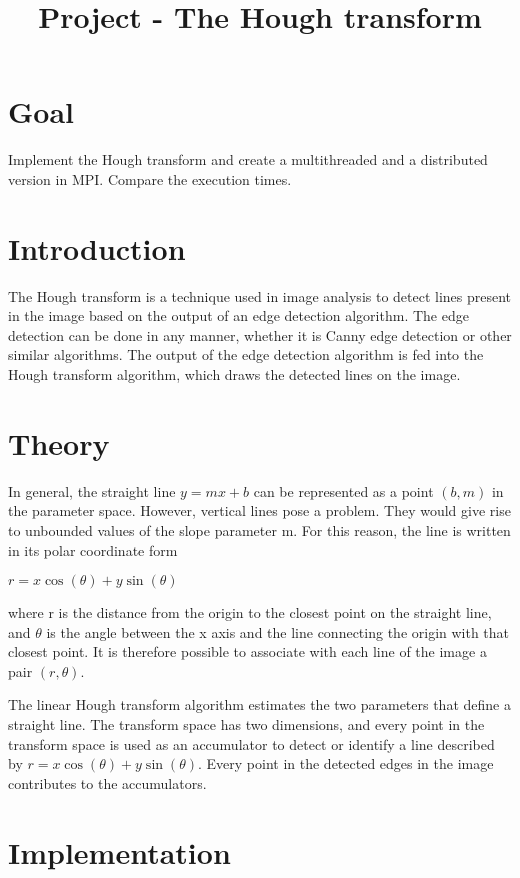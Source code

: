 \documentclass[journal, onecolumn, 12pt]{IEEEtran}
\begin{document}
\title{Project - The Hough transform \\
}

\maketitle

\section{Goal}
Implement the Hough transform and create a multithreaded and a distributed version in MPI. Compare the execution times.


\section{Introduction}
The Hough transform is a technique used in image analysis to detect lines present in the image based on the output of an edge detection algorithm. The edge detection can be done in any manner, whether it is Canny edge detection or other similar algorithms.
The output of the edge detection algorithm is fed into the Hough transform algorithm, which draws the detected lines on the image.

\section{Theory}
In general, the straight line $ y = mx + b $ can be represented as a point $ (b, m) $ in the parameter space. However, vertical lines pose a problem. They would give rise to unbounded values of the slope parameter m. For this reason, the line is written in its polar coordinate form 

	$ r = x\cos(\theta) + y\sin(\theta)$

where r is the distance from the origin to the closest point on the straight line, and $ \theta $ is the angle between the x axis and the line connecting the origin with that closest point. It is therefore possible to associate with each line of the image a pair $ (r, \theta) $. 

The linear Hough transform algorithm estimates the two parameters that define a straight line. The transform space has two dimensions, and every point in the transform space is used as an accumulator to detect or identify a line described by $ r = x\cos(\theta) + y\sin(\theta)$. Every point in the detected edges in the image contributes to the accumulators.

\section{Implementation}
\end{document}
